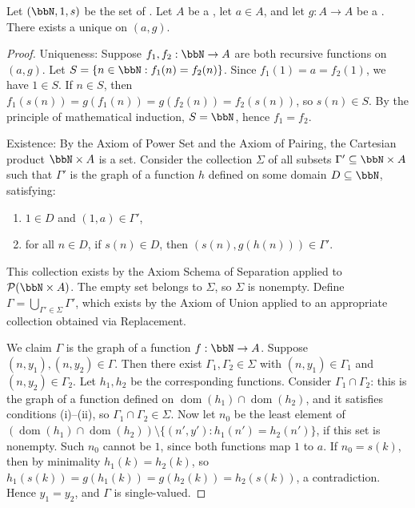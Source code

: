 \begin{proposition} \label{proposition:recursive_function_existence_uniqueness}
Let $(\bbN, 1, s)$ be the set of . Let $A$ be a , let $a \in A$, and let $g: A \to A$ be a . There exists a unique  on $(a, g)$.
\end{proposition}

\begin{proof}
Uniqueness: Suppose $f_1, f_2: \bbN \to A$ are both recursive functions on $(a, g)$. Let $S = \{n \in \bbN : f_1(n) = f_2(n)\}$. Since $f_1(1) = a = f_2(1)$, we have $1 \in S$. If $n \in S$, then $f_1(s(n)) = g(f_1(n)) = g(f_2(n)) = f_2(s(n))$, so $s(n) \in S$. By the principle of mathematical induction, $S = \bbN$, hence $f_1 = f_2$.

Existence: By the Axiom of Power Set and the Axiom of Pairing, the Cartesian product $\bbN \times A$ is a set. Consider the collection $\Sigma$ of all subsets $\Gamma' \subseteq \bbN \times A$ such that $\Gamma'$ is the graph of a function $h$ defined on some domain $D \subseteq \bbN$, satisfying:
\begin{enumerate}
    \item $1 \in D$ and $(1, a) \in \Gamma'$,
    \item for all $n \in D$, if $s(n) \in D$, then $(s(n), g(h(n))) \in \Gamma'$.
\end{enumerate}
This collection exists by the Axiom Schema of Separation applied to $\mathcal{P}(\bbN \times A)$. The empty set belongs to $\Sigma$, so $\Sigma$ is nonempty. Define $\Gamma = \bigcup_{\Gamma' \in \Sigma} \Gamma'$, which exists by the Axiom of Union applied to an appropriate collection obtained via Replacement.

We claim $\Gamma$ is the graph of a function $f: \bbN \to A$. Suppose $(n, y_1), (n, y_2) \in \Gamma$. Then there exist $\Gamma_1, \Gamma_2 \in \Sigma$ with $(n, y_1) \in \Gamma_1$ and $(n, y_2) \in \Gamma_2$. Let $h_1, h_2$ be the corresponding functions. Consider $\Gamma_1 \cap \Gamma_2$: this is the graph of a function defined on $\operatorname{dom}(h_1) \cap \operatorname{dom}(h_2)$, and it satisfies conditions (i)--(ii), so $\Gamma_1 \cap \Gamma_2 \in \Sigma$. Now let $n_0$ be the least element of $(\operatorname{dom}(h_1) \cap \operatorname{dom}(h_2)) \setminus \{(n', y') : h_1(n') = h_2(n')\}$, if this set is nonempty. Such $n_0$ cannot be $1$, since both functions map $1$ to $a$. If $n_0 = s(k)$, then by minimality $h_1(k) = h_2(k)$, so $h_1(s(k)) = g(h_1(k)) = g(h_2(k)) = h_2(s(k))$, a contradiction. Hence $y_1 = y_2$, and $\Gamma$ is single-valued.


\end{proof}

